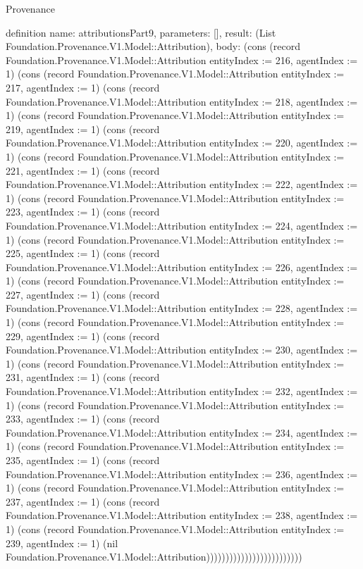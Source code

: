 \begin{lexlean}{Provenance}
\begin{semanticmodule}
definition{
  name: attributionsPart9,
  parameters: [],
  result: (List Foundation.Provenance.V1.Model::Attribution),
  body: (cons (record Foundation.Provenance.V1.Model::Attribution {entityIndex := 216, agentIndex := 1}) (cons (record Foundation.Provenance.V1.Model::Attribution {entityIndex := 217, agentIndex := 1}) (cons (record Foundation.Provenance.V1.Model::Attribution {entityIndex := 218, agentIndex := 1}) (cons (record Foundation.Provenance.V1.Model::Attribution {entityIndex := 219, agentIndex := 1}) (cons (record Foundation.Provenance.V1.Model::Attribution {entityIndex := 220, agentIndex := 1}) (cons (record Foundation.Provenance.V1.Model::Attribution {entityIndex := 221, agentIndex := 1}) (cons (record Foundation.Provenance.V1.Model::Attribution {entityIndex := 222, agentIndex := 1}) (cons (record Foundation.Provenance.V1.Model::Attribution {entityIndex := 223, agentIndex := 1}) (cons (record Foundation.Provenance.V1.Model::Attribution {entityIndex := 224, agentIndex := 1}) (cons (record Foundation.Provenance.V1.Model::Attribution {entityIndex := 225, agentIndex := 1}) (cons (record Foundation.Provenance.V1.Model::Attribution {entityIndex := 226, agentIndex := 1}) (cons (record Foundation.Provenance.V1.Model::Attribution {entityIndex := 227, agentIndex := 1}) (cons (record Foundation.Provenance.V1.Model::Attribution {entityIndex := 228, agentIndex := 1}) (cons (record Foundation.Provenance.V1.Model::Attribution {entityIndex := 229, agentIndex := 1}) (cons (record Foundation.Provenance.V1.Model::Attribution {entityIndex := 230, agentIndex := 1}) (cons (record Foundation.Provenance.V1.Model::Attribution {entityIndex := 231, agentIndex := 1}) (cons (record Foundation.Provenance.V1.Model::Attribution {entityIndex := 232, agentIndex := 1}) (cons (record Foundation.Provenance.V1.Model::Attribution {entityIndex := 233, agentIndex := 1}) (cons (record Foundation.Provenance.V1.Model::Attribution {entityIndex := 234, agentIndex := 1}) (cons (record Foundation.Provenance.V1.Model::Attribution {entityIndex := 235, agentIndex := 1}) (cons (record Foundation.Provenance.V1.Model::Attribution {entityIndex := 236, agentIndex := 1}) (cons (record Foundation.Provenance.V1.Model::Attribution {entityIndex := 237, agentIndex := 1}) (cons (record Foundation.Provenance.V1.Model::Attribution {entityIndex := 238, agentIndex := 1}) (cons (record Foundation.Provenance.V1.Model::Attribution {entityIndex := 239, agentIndex := 1}) (nil Foundation.Provenance.V1.Model::Attribution)))))))))))))))))))))))))
}


\end{semanticmodule}
\end{lexlean}
